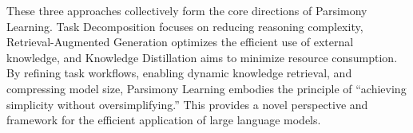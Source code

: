 These three approaches collectively form the core directions of Parsimony Learning. Task Decomposition focuses on reducing reasoning complexity, Retrieval-Augmented Generation optimizes the efficient use of external knowledge, and Knowledge Distillation aims to minimize resource consumption. By refining task workflows, enabling dynamic knowledge retrieval, and compressing model size, Parsimony Learning embodies the principle of “achieving simplicity without oversimplifying.” This provides a novel perspective and framework for the efficient application of large language models.